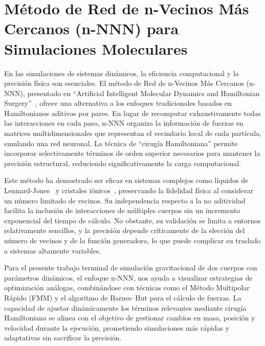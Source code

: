\section[Método n-NNN]{Método de Red de n-Vecinos Más Cercanos (n-NNN) para Simulaciones Moleculares}%
\label{sec:state_of_the_art_03}

En las simulaciones de sistemas dinámicos, la eficiencia computacional y la precisión física son esenciales. El método de Red de n-Vecinos Más Cercanos (n-NNN), presentado en “Artificial Intelligent Molecular Dynamics and Hamiltonian Surgery”~\cite{Maguire2005}, ofrece una alternativa a los enfoques tradicionales basados en Hamiltonianos aditivos por pares. En lugar de recomputar exhaustivamente todas las interacciones en cada paso, n-NNN organiza la información de fuerzas en matrices multidimensionales que representan el vecindario local de cada partícula, emulando una red neuronal. La técnica de “cirugía Hamiltoniana” permite incorporar selectivamente términos de orden superior necesarios para mantener la precisión estructural, reduciendo significativamente la carga computacional.

Este método ha demostrado ser eficaz en sistemas complejos como líquidos de Lennard-Jones~\cite{Allen2017} y cristales iónicos~\cite{Atkins2008}, preservando la fidelidad física al considerar un número limitado de vecinos. Su independencia respecto a la no aditividad facilita la inclusión de interacciones de múltiples cuerpos sin un incremento exponencial del tiempo de cálculo. No obstante, su validación se limita a entornos relativamente sencillos, y la precisión depende críticamente de la elección del número de vecinos y de la función generadora, lo que puede complicar su traslado a sistemas altamente variables.

Para el presente trabajo terminal de simulación gravitacional de dos cuerpos con parámetros dinámicos, el enfoque n-NNN, nos ayuda a visualizar estrategias de optimización análogas, combinándose con técnicas como el Método Multipolar Rápido (FMM) y el algoritmo de Barnes–Hut para el cálculo de fuerzas. La capacidad de ajustar dinámicamente los términos relevantes mediante cirugía Hamiltoniana se alinea con el objetivo de gestionar cambios en masa, posición y velocidad durante la ejecución, prometiendo simulaciones más rápidas y adaptativas sin sacrificar la precisión.

